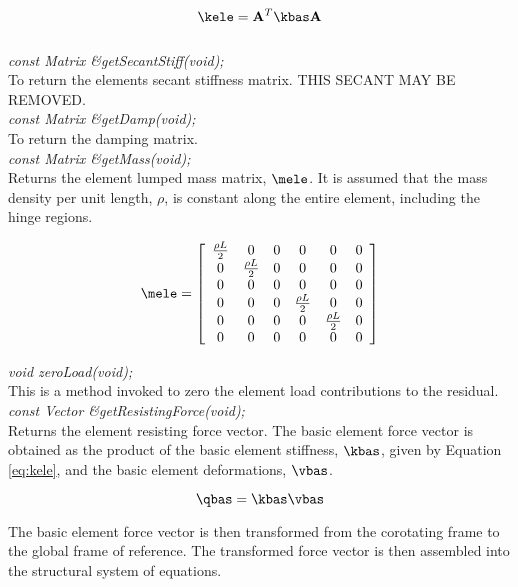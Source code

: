 \begin{equation}
\kele = \mathbf{A}^T \kbas \mathbf{A}
\end{equation} \\

{\em const Matrix \&getSecantStiff(void);} \\
To return the elements secant stiffness matrix. THIS SECANT MAY
BE REMOVED. \\

{\em const Matrix \&getDamp(void);} \\
To return the damping matrix. \\ 

{\em const Matrix \&getMass(void);} \\
Returns the element lumped mass matrix, $\mele$. It is assumed that the mass density per unit
length, $\rho$, is constant along the entire element, including the hinge regions.

\begin{equation}
\label{eq:mele}
\mele = \left[
   \begin{array}{c c c c c c}
      \frac{\rho L}{2} & 0 & 0 & 0 & 0 & 0 \\
      0 & \frac{\rho L}{2} & 0 & 0 & 0 & 0 \\
      0 & 0 & 0 & 0 & 0 & 0 \\
      0 & 0 & 0 & \frac{\rho L}{2} & 0 & 0 \\
      0 & 0 & 0 & 0 & \frac{\rho L}{2} & 0 \\
      0 & 0 & 0 & 0 & 0 & 0
   \end{array}
 \right]
\end{equation}

{\em void zeroLoad(void);}\\
This is a method invoked to zero the element load contributions to the residual. \\ 

{\em const Vector \&getResistingForce(void);} \\
Returns the element resisting force vector.  The basic element force vector is obtained as
the product of the basic element stiffness, $\kbas$, given by Equation \ref{eq:kele}, and the
basic element deformations, $\vbas$.

\begin{equation}
\qbas = \kbas \vbas
\end{equation}

The basic element force vector is then transformed from the corotating frame to the global frame
of reference.  The transformed force vector is then assembled into the structural system
of equations.

